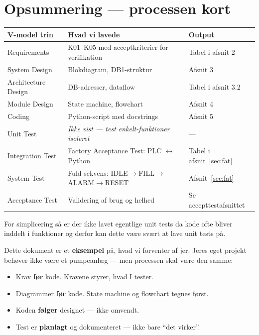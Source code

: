 \documentclass[12pt, a4paper]{article}
\begin{document}
\section{Opsummering --- processen kort}

\begin{center}
\begin{tabular}{lll}
\toprule
\textbf{V-model trin} & \textbf{Hvad vi lavede} & \textbf{Output} \\
\midrule
Requirements          & K01--K05 med acceptkriterier for verifikation & Tabel i afsnit 2 \\
System Design         & Blokdiagram, DB1-struktur          & Afsnit 3 \\
Architecture Design   & DB-adresser, dataflow              & Tabel i afsnit 3.2 \\
Module Design         & State machine, flowchart           & Afsnit 4 \\
Coding                & Python-script med docstrings       & Afsnit 5 \\
Unit Test             & \textit{Ikke vist --- test enkelt-funktioner isoleret} & --- \\
Integration Test      & Factory Acceptance Test: PLC $\leftrightarrow$ Python & Tabel i afsnit~\ref{sec:fat}\\
System Test           & Fuld sekvens: IDLE$\to$FILL$\to$ALARM$\to$RESET & Afsnit~\ref{sec:fat} \\
Acceptance Test       & Validering af brug og helhed & Se accepttestafsnittet \\
\bottomrule
\end{tabular}
\end{center}
For simplicering så er der ikke lavet egentlige unit tests da kode ofte bliver inddelt i funktioner og derfor kan dette være svært at lave unit tests på.
\vspace{0.5cm}

\begin{tcolorbox}[tipbox, title={\faStar\quad Det er sådan vi gerne vil have det}]
Dette dokument er et \textbf{eksempel} på, hvad vi forventer af jer.
Jeres eget projekt behøver ikke være et pumpeanlæg --- men processen
skal være den samme:

\begin{itemize}[leftmargin=1.2em, itemsep=4pt]
  \item[\textcolor{successgreen}{\faArrowRight}]
    Krav \textbf{før} kode. Kravene styrer, hvad I tester.
  \item[\textcolor{successgreen}{\faArrowRight}]
    Diagrammer \textbf{før} kode. State machine og flowchart tegnes først.
  \item[\textcolor{successgreen}{\faArrowRight}]
    Koden \textbf{følger} designet --- ikke omvendt.
  \item[\textcolor{successgreen}{\faArrowRight}]
    Test er \textbf{planlagt} og dokumenteret --- ikke bare ``det virker''.
\end{itemize}
\end{tcolorbox}
\end{document}
